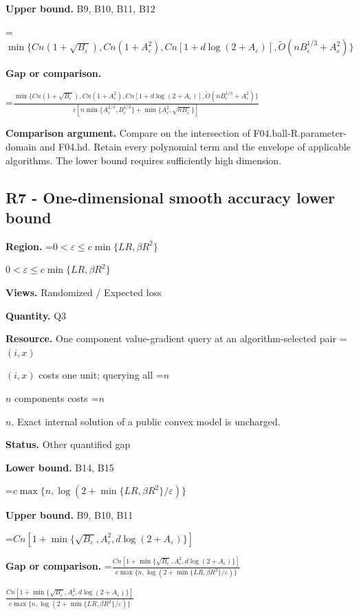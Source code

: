 \documentclass[10pt,a4paper]{article}
\newcommand{\AtlasMath}[1]{\par\begingroup\centering\setbox0=\hbox{$\displaystyle #1$}\ifdim\wd0>1.4\linewidth\typeout{ATLAS WIDE FORMULA: \the\wd0}\fi\ifdim\wd0>\linewidth\resizebox{\linewidth}{!}{\box0}\else\box0\fi\par\endgroup}
\newcommand{\AtlasInlineMath}[1]{\begingroup\setbox0=\hbox{$#1$}\ifdim\wd0>.4\linewidth\endgroup\AtlasMath{#1}\else\endgroup$#1$\fi}
\begin{document}
\textbf{Upper bound.} B9, B10, B11, B12



\AtlasMath{\min\{Cn(1+\sqrt{B_\varepsilon}),Cn(1+A_\varepsilon^2),Cn[1+d\log(2+A_\varepsilon)],\widetilde{O}(nB_\varepsilon^{1/3}+A_\varepsilon^2)\}}


\textbf{Gap or comparison.}
\AtlasMath{\frac{\min\{Cn(1+\sqrt{B_\varepsilon}),Cn(1+A_\varepsilon^2),Cn[1+d\log(2+A_\varepsilon)],\widetilde{O}(nB_\varepsilon^{1/3}+A_\varepsilon^2)\}}{c[n\min\{A_\varepsilon^{2/3},B_\varepsilon^{1/3}\}+\min\{A_\varepsilon^2,\sqrt{nB_\varepsilon}\}]}}




\textbf{Comparison argument.} Compare on the intersection of F04.ball-R.parameter-domain and F04.hd. Retain every polynomial term and the envelope of applicable algorithms. The lower bound requires sufficiently high dimension.



\subsection{R7 - One-dimensional smooth accuracy lower bound}


\textbf{Region.} \AtlasInlineMath{0<\varepsilon\le c\min\{LR,\beta R^2\}}



\textbf{Views.} Randomized / Expected loss



\textbf{Quantity.} Q3



\textbf{Resource.} One component value-gradient query at an algorithm-selected pair \AtlasInlineMath{(i,x)} costs one unit; querying all \AtlasInlineMath{n} components costs \AtlasInlineMath{n}. Exact internal solution of a public convex model is uncharged.



\textbf{Status.} Other quantified gap



\textbf{Lower bound.} B14, B15



\AtlasMath{c\max\{n,\log(2+\min\{LR,\beta R^2\}/\varepsilon)\}}


\textbf{Upper bound.} B9, B10, B11



\AtlasMath{Cn[1+\min\{\sqrt{B_\varepsilon},A_\varepsilon^2,d\log(2+A_\varepsilon)\}]}


\textbf{Gap or comparison.} \AtlasInlineMath{\frac{Cn[1+\min\{\sqrt{B_\varepsilon},A_\varepsilon^2,d\log(2+A_\varepsilon)\}]}{c\max\{n,\log(2+\min\{LR,\beta R^2\}/\varepsilon)\}}}
\end{document}
